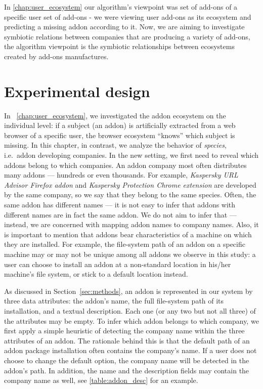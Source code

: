 \documentclass[11pt,oneside]{book}
\let\Oldsection\section
\renewcommand{\section}{\FloatBarrier\Oldsection}
\begin{document}
In \autoref{chap:user_ecosystem} our algorithm's viewpoint was set of add-ons of a specific user set of add-ons - we were viewing user add-ons as its ecosystem and predicting a missing addon according to it. Now, we are aiming to investigate symbiotic relations between companies that are producing a variety of add-ons, the algorithm viewpoint is the symbiotic relationships between ecosystems created by add-ons manufactures.
\fi

\section{Experimental design}

In ~\autoref{chap:user_ecosystem}, we investigated the addon ecosystem on the individual level: if a subject (an addon) is artificially extracted from a web browser of a specific user, the browser ecosystem ``knows'' which subject is missing. In this chapter, in contrast, we analyze the behavior of \emph{species}, i.e.~addon developing companies. In the new setting, we first need to reveal which addons belong to which companies. An addon company most often distributes many addons --- hundreds or even thousands. For example, \emph{Kaspersky URL Advisor Firefox addon} and \emph{Kaspersky Protection Chrome extension} are developed by the same company, so we say that they belong to the same species. Often, the same addon has different names --- it is not easy to infer that addons with different names are in fact the same addon. We do not aim to infer that --- instead, we are concerned with mapping addon names to company names. Also, it is important to mention that addons bear characteristics of a machine on which they are installed. For example, the file-system path of an addon on a specific machine may or may not be unique among all addons we observe in this study: a user can choose to install an addon at a non-standard location in his/her machine's file system, or stick to a default location instead.

As discussed in Section~\ref{sec:methods}, an addon is represented in our system by three data attributes: the addon's name, the full file-system path of its installation, and a textual description. Each one (or any two but not all three) of the attributes may be empty. To infer which addon belongs to which company, we first apply a simple heuristic of detecting the company name within the three attributes of an addon. The rationale behind this is that the default path of an addon package installation often contains the company's name. If a user does not choose to change the default option, the company name will be detected in the addon's path. In addition, the name and the description fields may contain the company name as well, see \autoref{table:addon_desc} for an example.
\end{document}
